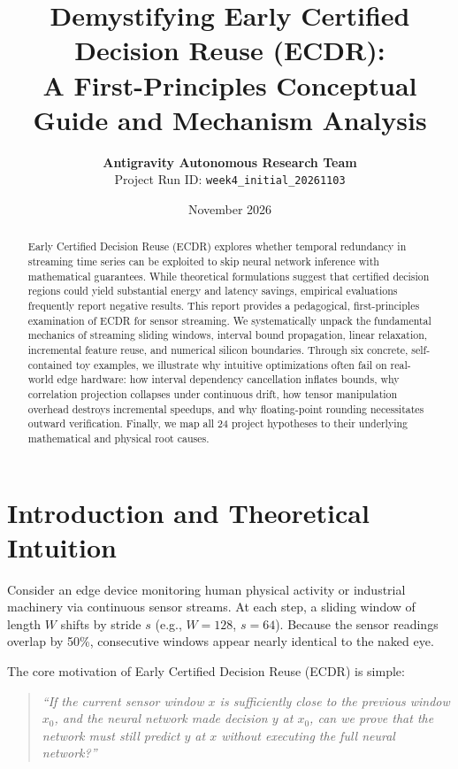 \documentclass[11pt,article]{article}
\title{\textbf{Demystifying Early Certified Decision Reuse (ECDR):\\A First-Principles Conceptual Guide and Mechanism Analysis}}
\author{\textbf{Antigravity Autonomous Research Team}\\Project Run ID: \texttt{week4\_initial\_20261103}}
\date{November 2026}
\theoremstyle{definition}
\begin{document}
\maketitle

\begin{abstract}
Early Certified Decision Reuse (ECDR) explores whether temporal redundancy in streaming time series can be exploited to skip neural network inference with mathematical guarantees. While theoretical formulations suggest that certified decision regions could yield substantial energy and latency savings, empirical evaluations frequently report negative results. This report provides a pedagogical, first-principles examination of ECDR for sensor streaming. We systematically unpack the fundamental mechanics of streaming sliding windows, interval bound propagation, linear relaxation, incremental feature reuse, and numerical silicon boundaries. Through six concrete, self-contained toy examples, we illustrate why intuitive optimizations often fail on real-world edge hardware: how interval dependency cancellation inflates bounds, why correlation projection collapses under continuous drift, how tensor manipulation overhead destroys incremental speedups, and why floating-point rounding necessitates outward verification. Finally, we map all 24 project hypotheses to their underlying mathematical and physical root causes.
\end{abstract}

\tableofcontents
\newpage

\section{Introduction and Theoretical Intuition}

Consider an edge device monitoring human physical activity or industrial machinery via continuous sensor streams. At each step, a sliding window of length $W$ shifts by stride $s$ (e.g., $W=128$, $s=64$). Because the sensor readings overlap by 50\%, consecutive windows appear nearly identical to the naked eye.

The core motivation of Early Certified Decision Reuse (ECDR) is simple:
\begin{quote}
\textit{``If the current sensor window $x$ is sufficiently close to the previous window $x_0$, and the neural network made decision $y$ at $x_0$, can we prove that the network must still predict $y$ at $x$ without executing the full neural network?''}
\end{quote}
\end{document}
